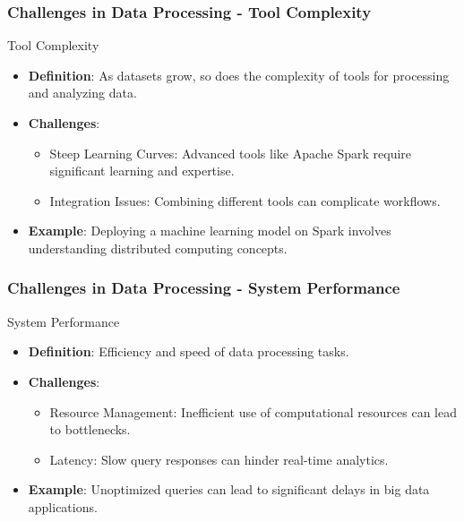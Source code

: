 \documentclass[aspectratio=169]{beamer}
\begin{document}
\begin{frame}[fragile]
    \frametitle{Challenges in Data Processing - Tool Complexity}
    \begin{block}{Tool Complexity}
        \begin{itemize}
            \item \textbf{Definition}: As datasets grow, so does the complexity of tools for processing and analyzing data.
            \item \textbf{Challenges}:
            \begin{itemize}
                \item Steep Learning Curves: Advanced tools like Apache Spark require significant learning and expertise.
                \item Integration Issues: Combining different tools can complicate workflows.
            \end{itemize}
            \item \textbf{Example}: Deploying a machine learning model on Spark involves understanding distributed computing concepts.
        \end{itemize}
    \end{block}
\end{frame}

\begin{frame}[fragile]
    \frametitle{Challenges in Data Processing - System Performance}
    \begin{block}{System Performance}
        \begin{itemize}
            \item \textbf{Definition}: Efficiency and speed of data processing tasks.
            \item \textbf{Challenges}:
            \begin{itemize}
                \item Resource Management: Inefficient use of computational resources can lead to bottlenecks.
                \item Latency: Slow query responses can hinder real-time analytics.
            \end{itemize}
            \item \textbf{Example}: Unoptimized queries can lead to significant delays in big data applications.
        \end{itemize}
    \end{block}
\end{frame}
\end{document}
